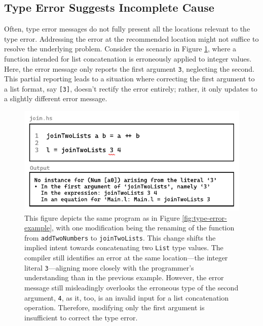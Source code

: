 \subsection*{Type Error Suggests Incomplete Cause}
\label{subsec:imcomplete}

Often, type error messages do not fully present all the locations relevant to the type error. Addressing the error at the recommended location might not suffice to resolve the underlying problem. Consider the scenario in Figure \ref{fig:type-error-example-2}, where a function intended for list concatenation is erroneously applied to integer values. Here, the error message only reports the first argument \texttt{3}, neglecting the second. This partial reporting leads to a situation where correcting the first argument to a list format, say \texttt{[3]}, doesn't rectify the error entirely; rather, it only updates to a slightly different error message. 



\begin{figure}[htbp]
    \centering
    \includegraphics[width=\linewidth]{TypeErrorExample2}
  \caption[Illustrating a programming error in Haskell, featuring a function named \texttt{joinTwoLists} with a type error and the corresponding compiler output]{
    \label{fig:type-error-example-2}
    This figure depicts the same program as in Figure \ref{fig:type-error-example}, with one modification being the renaming of the function from \texttt{addTwoNumbers} to \texttt{joinTwoLists}. This change shifts the implied intent towards concatenating two \texttt{List} type values. The compiler still identifies an error at the same location—the integer literal \texttt{3}—aligning more closely with the programmer's understanding than in the previous example. However, the error message still misleadingly overlooks the erroneous type of the second argument, \texttt{4}, as it, too, is an invalid input for a list concatenation operation. Therefore, modifying only the first argument is insufficient to correct the type error.
    }
\end{figure}

